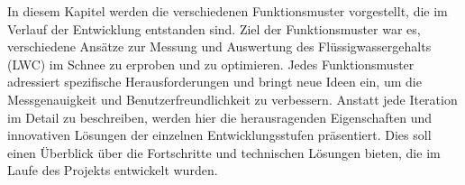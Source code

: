 
In diesem Kapitel werden die verschiedenen Funktionsmuster vorgestellt, die im Verlauf der Entwicklung entstanden sind. Ziel der Funktionsmuster war es, verschiedene Ansätze zur Messung und Auswertung des Flüssigwassergehalts (LWC) im Schnee zu erproben und zu optimieren. Jedes Funktionsmuster adressiert spezifische Herausforderungen und bringt neue Ideen ein, um die Messgenauigkeit und Benutzerfreundlichkeit zu verbessern. Anstatt jede Iteration im Detail zu beschreiben, werden hier die herausragenden Eigenschaften und innovativen Lösungen der einzelnen Entwicklungsstufen präsentiert. Dies soll einen Überblick über die Fortschritte und technischen Lösungen bieten, die im Laufe des Projekts entwickelt wurden.

